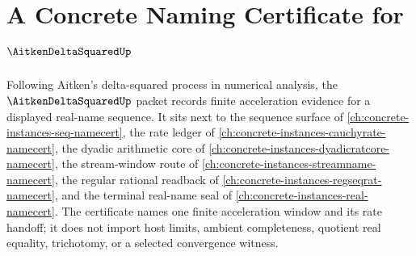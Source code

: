 \chapter{A Concrete Naming Certificate for $\AitkenDeltaSquaredUp$}
\label{ch:concrete-instances-aitken-delta-squared-namecert}

Following Aitken's delta-squared process in numerical analysis, the $\AitkenDeltaSquaredUp$ packet records finite acceleration evidence for a displayed real-name sequence. It sits next to the sequence surface of \autoref{ch:concrete-instances-seq-namecert}, the rate ledger of \autoref{ch:concrete-instances-cauchyrate-namecert}, the dyadic arithmetic core of \autoref{ch:concrete-instances-dyadicratcore-namecert}, the stream-window route of \autoref{ch:concrete-instances-streamname-namecert}, the regular rational readback of \autoref{ch:concrete-instances-regseqrat-namecert}, and the terminal real-name seal of \autoref{ch:concrete-instances-real-namecert}. The certificate names one finite acceleration window and its rate handoff; it does not import host limits, ambient completeness, quotient real equality, trichotomy, or a selected convergence witness.

